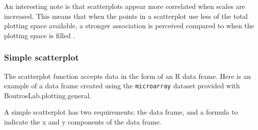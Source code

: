 \documentclass[letterpaper]{report}\usepackage[]{graphicx}\usepackage[]{color}
\begin{document}
An interesting note is that scatterplots appear more correlated when scales are increased. This means that when the points in a scatterplot use less of the total plotting space available, a stronger association is perceived compared to when the plotting space is filled \cite{cleveland-scatter}.

\subsubsection{Simple scatterplot}
The scatterplot function accepts data in the form of an R  data frame. Here is an example of a data frame created using the \verb|microarray| dataset provided with BoutrosLab.plotting.general.

A simple scatterplot has two requirements: the data frame, and a formula to indicate the x and y components of the data frame.

\end{document}
